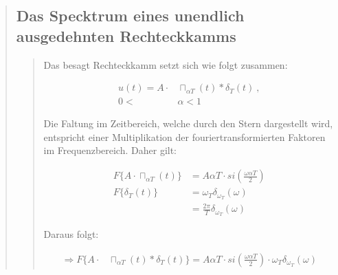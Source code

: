     \begin{quote}
   	
        \subsection{Das Specktrum eines unendlich ausgedehnten Rechteckkamms}
        \begin{quote}
            Das besagt Rechteckkamm setzt sich wie folgt zusammen:
          
            \vspace{1em}
            
            \begin{equation*}
            	\begin{split}
            		u(t) = A \cdot &\sqcap_{\alpha T}(t) \ast \delta_T(t)\ , \\
                    0 < &\alpha < 1
            	\end{split}
            \end{equation*}
          	
          	Die Faltung im Zeitbereich, welche durch den Stern dargestellt wird,
          	entspricht einer Multiplikation der fouriertransformierten Faktoren
          	im Frequenzbereich. Daher gilt:
          	
          	\vspace{1em}
          	
          	\begin{equation*}
            	\begin{split}
            		F\{ A \cdot \sqcap_{\alpha T}(t) \} &= A \alpha T \cdot si(\frac{\omega \alpha T}{2})\\
                    F\{ \delta_T(t) \} &= \omega_T \delta_{\omega_T} (\omega)\\
                    &= \frac{2 \pi}{T} \delta_{\omega_T} (\omega)
            	\end{split}
            \end{equation*}
          	          
          	Daraus folgt:
          	
          	\vspace{1em}
          	
          	\begin{equation*}
            	\begin{split}
            		\Rightarrow
            		F\{ A \cdot &\sqcap_{\alpha T}(t) \ast \delta_T(t)\} = A \alpha T \cdot si(\frac{\omega \alpha T}{2})
            		\cdot \omega_T \delta_{\omega_T} (\omega)
            	\end{split}
            \end{equation*}
          	
   		 \end{quote}  	
	\end{quote}
         	

